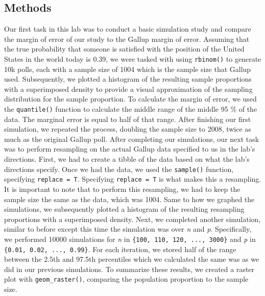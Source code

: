 \documentclass{article}\usepackage[]{graphicx}\usepackage[]{xcolor}
\begin{document}
\begin{multicols}{2}
\section{Methods}
Our first task in this lab was to conduct a basic simulation study and compare the margin of error of our study to the Gallup margin of error. Assuming that the true probability that someone is satisfied with the position of the United States in the world today is 0.39, we were tasked with using \texttt{rbinom()} to generate 10k polls, each with a sample size of 1004 which is the sample size that Gallup used. Subsequently, we plotted a histogram of the resulting sample proportions with a superimposed density to provide a visual approximation of the sampling distribution for the sample proportion. To calculate the margin of error, we used the \texttt{quantile()} function to calculate the middle range of the middle 95 \% of the data. The marginal error is equal to half of that range. After finishing our first simulation, we repeated the process, doubling the sample size to 2008, twice as much as the original Gallup poll.
\newline
\indent 
After completing our simulations, our next task was to perform resampling on the actual Gallup data specified to us in the lab's directions. First, we had to create a tibble of the data based on what the lab's directions specify. Once we had the data, we used the \texttt{sample()} function, specifying \texttt{replace = T}. Specifying \texttt{replace = T} is what makes this a resampling. It is important to note that to perform this resampling, we had to keep the sample size the same as the data, which was 1004. Same to how we graphed the simulations, we  subsequently plotted a histogram of the resulting resampling proportions with a superimposed density.
\newline
\indent 
Next, we completed another simulation, similar to before except this time the simulation was over \textit{n} and \textit{p}. Specifically, we performed 10000 simulations for \textit{n} in \verb|{100, 110, 120, ..., 3000}| and \textit{p} in \verb|{0.01, 0.02, ..., 0.99}|. For each iteration, we stored half of the range between the 2.5th and 97.5th percentiles which we calculated the same was as we did in our previous simulations. To summarize these results, we created a raster plot with \texttt{geom\_raster()}, comparing the population proportion to the sample size.
\newline
\indent 

\end{multicols}
\end{document}
